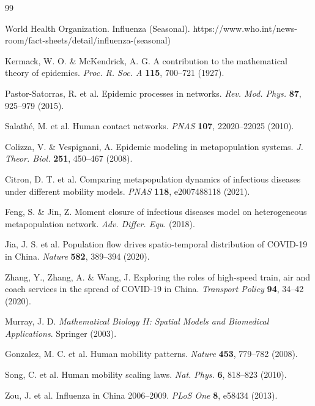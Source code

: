 \documentclass[10pt,letterpaper]{article}
\begin{document}
	\begin{thebibliography}{99}
		
		World Health Organization. Influenza (Seasonal). 
		https://www.who.int/news-room/fact-sheets/detail/influenza-(seasonal)
		
		Kermack, W. O. \& McKendrick, A. G. A contribution to the mathematical theory of epidemics. 
		\textit{Proc. R. Soc. A} \textbf{115}, 700–721 (1927).
		
		Pastor-Satorras, R. et al. Epidemic processes in networks. 
		\textit{Rev. Mod. Phys.} \textbf{87}, 925–979 (2015).
		
		Salathé, M. et al. Human contact networks. 
		\textit{PNAS} \textbf{107}, 22020–22025 (2010).
		
		Colizza, V. \& Vespignani, A. Epidemic modeling in metapopulation systems. 
		\textit{J. Theor. Biol.} \textbf{251}, 450–467 (2008).
		
		Citron, D. T. et al. Comparing metapopulation dynamics of infectious diseases under different mobility models. 
		\textit{PNAS} \textbf{118}, e2007488118 (2021).
		
		Feng, S. \& Jin, Z. Moment closure of infectious diseases model on heterogeneous metapopulation network. 
		\textit{Adv. Differ. Equ.} (2018).
		
		Jia, J. S. et al. Population flow drives spatio-temporal distribution of COVID-19 in China. 
		\textit{Nature} \textbf{582}, 389–394 (2020).
		
		Zhang, Y., Zhang, A. \& Wang, J. Exploring the roles of high-speed train, air and coach services in the spread of COVID-19 in China. 
		\textit{Transport Policy} \textbf{94}, 34–42 (2020).
		
		Murray, J. D. \textit{Mathematical Biology II: Spatial Models and Biomedical Applications}. Springer (2003).
		
		Gonzalez, M. C. et al. Human mobility patterns. 
		\textit{Nature} \textbf{453}, 779–782 (2008).
		
		Song, C. et al. Human mobility scaling laws. 
		\textit{Nat. Phys.} \textbf{6}, 818–823 (2010).
		
		Zou, J. et al. Influenza in China 2006–2009. 
		\textit{PLoS One} \textbf{8}, e58434 (2013).
		

\end{thebibliography}
\end{document}
